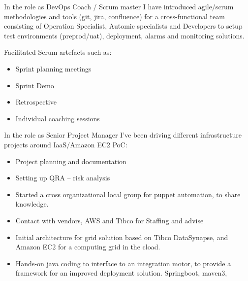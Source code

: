 In the role as DevOps Coach / Scrum master I have introduced agile/scrum methodologies and tools (git, jira, confluence) for a cross-functional team consisting of Operation Specialist, Automic specialists and Developers to setup test environments (preprod/uat), deployment, alarms and monitoring solutions. 

Facilitated Scrum artefacts such as: 
\begin{itemize}
    \item Sprint planning meetings 
    \item Sprint Demo 
    \item Retrospective 
    \item Individual coaching sessions 
\end{itemize}

In the role as Senior Project Manager I’ve been driving different infrastructure projects around IaaS/Amazon EC2 PoC: 
\begin{itemize}
    \item Project planning and documentation 
    \item Setting up QRA – risk analysis  
    \item Started a cross organizational local group for puppet automation, to share knowledge.
    \item Contact with vendors, AWS and Tibco for Staffing and advise 
    \item Initial architecture for grid solution based on Tibco DataSynapse, and Amazon EC2 for a computing grid in the cload. 
    \item Hands-on java coding to interface to an integration motor, to provide a framework for an improved deployment solution. Springboot, maven3,  
\end{itemize}


